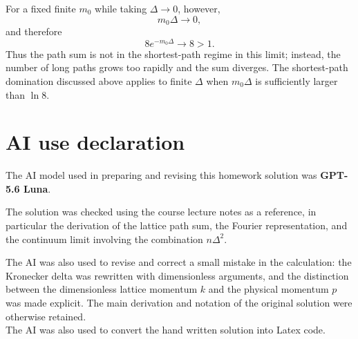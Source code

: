 \documentclass[12pt,a4paper]{article}
\begin{document}
For a fixed finite $m_0$ while taking $\Delta\to0$, however,
\[
m_0\Delta\longrightarrow0,
\]
and therefore
\[
8e^{-m_0\Delta}\longrightarrow8>1.
\]
Thus the path sum is not in the shortest-path regime in this limit; instead,
the number of long paths grows too rapidly and the sum diverges. The
shortest-path domination discussed above applies to finite $\Delta$ when
$m_0\Delta$ is sufficiently larger than $\ln8$.

\section*{AI use declaration}

The AI model used in preparing and revising this homework solution was
\textbf{GPT-5.6 Luna}.

The solution was checked using the course lecture notes as a reference,
in particular the derivation of the lattice path sum, the Fourier
representation, and the continuum limit involving the combination
$n\Delta^2$.

The AI was also used to revise and correct a small mistake in the
calculation: the Kronecker delta was rewritten with dimensionless
arguments, and the distinction between the dimensionless lattice momentum
$k$ and the physical momentum $p$ was made explicit. The main derivation
and notation of the original solution were otherwise retained.\\
The AI was also used to convert the hand written solution into Latex code.
\end{document}
